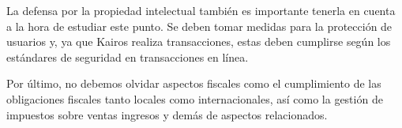 	La defensa por la propiedad intelectual también es importante tenerla en cuenta a la hora de estudiar este punto. Se deben tomar medidas para la protección de usuarios y, ya que Kairos realiza transacciones, estas deben cumplirse según los estándares de seguridad en transacciones en línea.
	
	Por último, no debemos olvidar aspectos fiscales como el cumplimiento de las obligaciones fiscales tanto locales como internacionales, así como la gestión de impuestos sobre ventas ingresos y demás de aspectos relacionados.	


